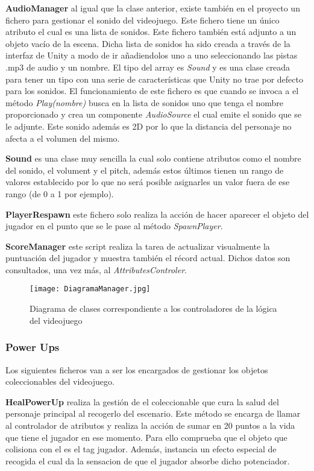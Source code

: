 \textbf{AudioManager} al igual que la clase anterior, existe también en el proyecto un fichero para gestionar el sonido del videojuego. Este fichero tiene un único atributo el cual es una lista de sonidos. Este fichero también está adjunto a un objeto vacío de la escena. Dicha lista de sonidos ha sido creada a través de la interfaz de Unity a modo de ir añadiendolos uno a uno seleccionando las pistas .mp3 de audio y un nombre. El tipo del array es \textit{Sound} y es una clase creada para tener un tipo con una serie de características que Unity no trae por defecto para los sonidos. El funcionamiento de este fichero es que cuando se invoca a el método \textit{Play(nombre)} busca en la lista de sonidos uno que tenga el nombre proporcionado y crea un componente \textit{AudioSource} el cual emite el sonido que se le adjunte. Este sonido además es 2D por lo que la distancia del personaje no afecta a el volumen del mismo.

\textbf{Sound} es una clase muy sencilla la cual solo contiene atributos como el nombre del sonido, el volument y el pitch, además estos últimos tienen un rango de valores establecido por lo que no será posible asignarles un valor fuera de ese rango (de 0 a 1 por ejemplo).

\textbf{PlayerRespawn} este fichero solo realiza la acción de hacer aparecer el objeto del jugador en el punto que se le pase al método \textit{SpawnPlayer}.

\textbf{ScoreManager} este script realiza la tarea de actualizar visualmente la puntuación del jugador y muestra también el récord actual. Dichos datos son consultados, una vez más, al \textit{AttributesControler}.

\begin{figure}[H]
    \centering
    \texttt{[image: DiagramaManager.jpg]}
    \caption{Diagrama de clases correspondiente a los controladores de la lógica del videojuego}
\end{figure}

\subsubsection{Power Ups}

Los siguientes ficheros van a ser los encargados de gestionar los objetos coleccionables del videojuego.

\textbf{HealPowerUp} realiza la gestión de el coleccionable que cura la salud del personaje principal al recogerlo del escenario. Este método se encarga de llamar al controlador de atributos y realiza la acción de sumar en 20 puntos a la vida que tiene el jugador en ese momento. Para ello comprueba que el objeto que colisiona con el es el tag jugador. Además, instancia un efecto especial de recogida el cual da la sensacion de que el jugador absorbe dicho potenciador.

